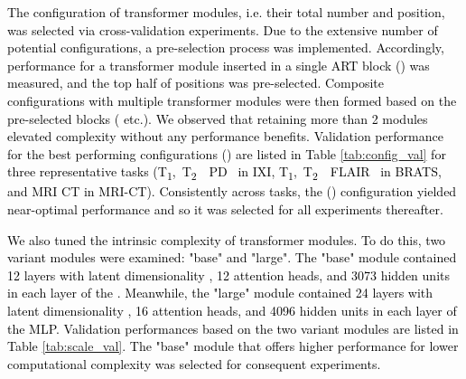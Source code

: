 \documentclass[journal,twoside,web]{ieeecolor}
\newcommand{\ToneTtwoPD}{T\textsubscript{1},~T\textsubscript{2}~~PD}
\newcommand{\ToneTtwoFlair}{T\textsubscript{1},~T\textsubscript{2}~~FLAIR}
\newcommand*{\revhl}{\textcolor{black}}
\begin{document}
\renewcommand{\tabcolsep}{3pt}
\renewcommand{\arraystretch}{1.20}
\begin{table}[ht]
\centering
\captionsetup{justification = justified,singlelinecheck = false}
\caption{\revhl{Average inference times (msec) of synthesis models per single cross-section.}}
\label{tab:times}
\vspace{-1ex}
\end{table}

\revhl{The configuration of transformer modules, i.e. their total number and position, was selected via cross-validation experiments. Due to the extensive number of potential configurations, a pre-selection process was implemented. Accordingly, performance for a transformer module inserted in a single ART block () was measured, and the top half of positions was pre-selected. Composite configurations with multiple transformer modules were then formed based on the pre-selected blocks ( etc.). We observed that retaining more than 2 modules elevated complexity without any performance benefits. Validation performance for the best performing configurations () are listed in \revhl{Table \ref{tab:config_val}} for three representative tasks (\ToneTtwoPD~ in IXI, \ToneTtwoFlair~ in BRATS, and MRI  CT in MRI-CT). Consistently across tasks, the () configuration yielded near-optimal performance and so it was selected for all experiments thereafter.}




\par
\revhl{We also tuned the intrinsic complexity of transformer modules. To do this, two variant modules were examined: "base" and "large". The "base" module contained 12 layers with latent dimensionality , 12 attention heads, and 3073 hidden units in each layer of the . Meanwhile, the "large" module contained 24 layers with latent dimensionality , 16 attention heads, and 4096 hidden units in each layer of the MLP. Validation performances based on the two variant modules are listed in Table \ref{tab:scale_val}. The "base" module that offers higher performance for lower computational complexity was selected for consequent experiments.}
\end{document}
